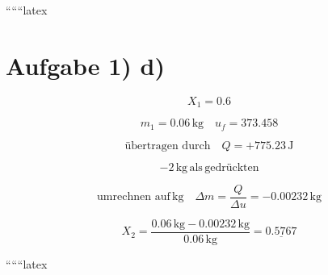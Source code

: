 ``````latex


\section*{Aufgabe 1) d)}

\[
X_1 = 0.6
\]

\[
m_1 = 0.06 \, \text{kg} \quad u_f = 373.458
\]

\[
\text{übertragen durch} \quad Q = +775.23 \, \text{J}
\]

\[
-2 \, \text{kg} \, \text{als} \, \text{gedrückten}
\]

\[
\text{umrechnen auf} \, \text{kg} \quad \Delta m = \frac{Q}{\Delta u} = -0.00232 \, \text{kg}
\]

\[
X_2 = \frac{0.06 \, \text{kg} - 0.00232 \, \text{kg}}{0.06 \, \text{kg}} = \underline{0.5767}
\]

``````latex



